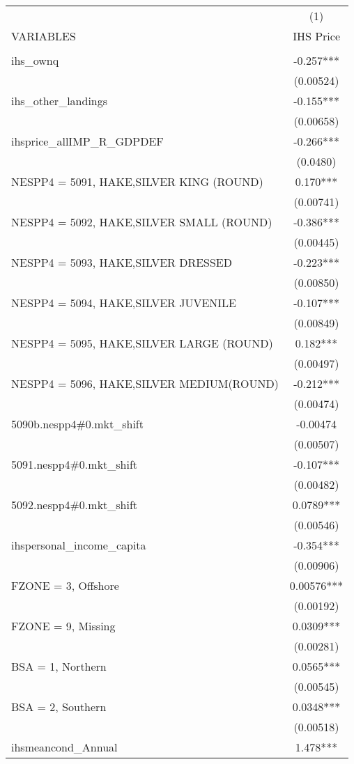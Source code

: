 \begin{tabular}{lc} \hline
 & (1) \\
VARIABLES & IHS Price \\ \hline
 &  \\
ihs\_ownq & -0.257*** \\
 & (0.00524) \\
ihs\_other\_landings & -0.155*** \\
 & (0.00658) \\
ihsprice\_allIMP\_R\_GDPDEF & -0.266*** \\
 & (0.0480) \\
NESPP4 = 5091, HAKE,SILVER KING (ROUND) & 0.170*** \\
 & (0.00741) \\
NESPP4 = 5092, HAKE,SILVER SMALL (ROUND) & -0.386*** \\
 & (0.00445) \\
NESPP4 = 5093, HAKE,SILVER DRESSED & -0.223*** \\
 & (0.00850) \\
NESPP4 = 5094, HAKE,SILVER JUVENILE & -0.107*** \\
 & (0.00849) \\
NESPP4 = 5095, HAKE,SILVER LARGE (ROUND) & 0.182*** \\
 & (0.00497) \\
NESPP4 = 5096, HAKE,SILVER MEDIUM(ROUND) & -0.212*** \\
 & (0.00474) \\
5090b.nespp4\#0.mkt\_shift & -0.00474 \\
 & (0.00507) \\
5091.nespp4\#0.mkt\_shift & -0.107*** \\
 & (0.00482) \\
5092.nespp4\#0.mkt\_shift & 0.0789*** \\
 & (0.00546) \\
ihspersonal\_income\_capita & -0.354*** \\
 & (0.00906) \\
FZONE = 3, Offshore & 0.00576*** \\
 & (0.00192) \\
FZONE = 9, Missing & 0.0309*** \\
 & (0.00281) \\
BSA = 1, Northern & 0.0565*** \\
 & (0.00545) \\
BSA = 2, Southern & 0.0348*** \\
 & (0.00518) \\
ihsmeancond\_Annual & 1.478*** \\

\end{tabular}
